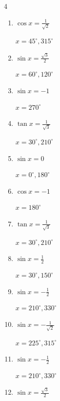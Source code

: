 \begin{multicols}{4}
\begin{enumerate}
  \item $\displaystyle \cos{x}  = \frac{1}{\sqrt{2}}$

        $\displaystyle x = 45^{\circ} , 315^{\circ}$

  \item $\displaystyle \sin{x}  = \frac{\sqrt{3}}{2}$

        $\displaystyle x = 60^{\circ} , 120^{\circ}$

  \item $\displaystyle \sin{x}  = -1$

        $\displaystyle x = 270^{\circ}$

  \item $\displaystyle \tan{x}  = \frac{1}{\sqrt{3}}$

        $\displaystyle x = 30^{\circ} , 210^{\circ}$

  \item $\displaystyle \sin{x}  = 0$

        $\displaystyle x = 0^{\circ} , 180^{\circ}$

\columnbreak %

  \item $\displaystyle \cos{x}  = -1$

        $\displaystyle x = 180^{\circ}$

  \item $\displaystyle \tan{x}  = \frac{1}{\sqrt{3}}$

        $\displaystyle x = 30^{\circ} , 210^{\circ}$

  \item $\displaystyle \sin{x}  = \frac{1}{2}$

        $\displaystyle x = 30^{\circ} , 150^{\circ}$

  \item $\displaystyle \sin{x}  = -\frac{1}{2}$

        $\displaystyle x = 210^{\circ} , 330^{\circ}$

  \item $\displaystyle \sin{x}  = -\frac{1}{\sqrt{2}}$

        $\displaystyle x = 225^{\circ} , 315^{\circ}$

  \item $\displaystyle \sin{x}  = -\frac{1}{2}$

        $\displaystyle x = 210^{\circ} , 330^{\circ}$

  \item $\displaystyle \sin{x}  = \frac{\sqrt{3}}{2}$


\end{enumerate}
\end{multicols}
